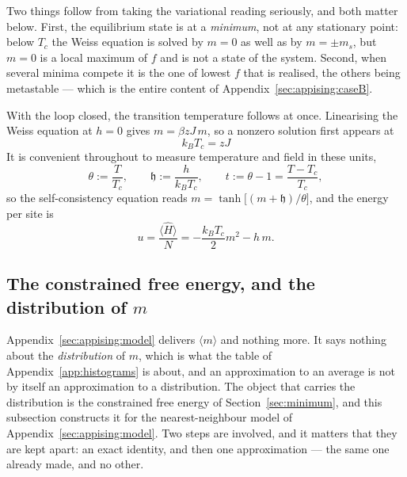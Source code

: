 \documentclass[10pt,a4paper]{article}
\theoremstyle{remark}
\begin{document}
Two things follow from taking the variational reading seriously, and both matter
below. First, the equilibrium state is at a \emph{minimum}, not at any stationary
point: below $T_c$ the Weiss equation is solved by $m=0$ as well as by
$m=\pm m_s$, but $m=0$ is a local maximum of $f$ and is not a state of the
system. Second, when several minima compete it is the one of lowest $f$ that is
realised, the others being metastable --- which is the entire content of
Appendix~\ref{sec:appising:caseB}.

With the loop closed, the transition temperature follows at once. Linearising the
Weiss equation at $h=0$ gives $m=\beta zJ\,m$, so a nonzero solution first
appears at
\[
\;k_BT_c=zJ\
\]
It is convenient throughout to measure temperature and field in these units,
\[
\theta:=\frac{T}{T_c},\qquad
\mathfrak{h}:=\frac{h}{k_BT_c},\qquad
t:=\theta-1=\frac{T-T_c}{T_c},
\]
so the self-consistency equation reads $m=\tanh\big[(m+\mathfrak{h})/\theta\big]$,
and the energy per site is
\[
u=\frac{\langle\hat H\rangle}{N}=-\frac{k_BT_c}{2}m^{2}-h\,m .
\]

\subsection{The constrained free energy, and the distribution of \texorpdfstring{$m$}{m}}
\label{sec:appising:exact}

Appendix~\ref{sec:appising:model} delivers $\langle m\rangle$ and nothing more. It
says nothing about the \emph{distribution} of $m$, which is what the table of
Appendix~\ref{app:histograms} is about, and an approximation to an average is not
by itself an approximation to a distribution. The object that carries the
distribution is the constrained free energy of Section~\ref{sec:minimum}, and
this subsection constructs it for the nearest-neighbour model of
Appendix~\ref{sec:appising:model}. Two steps are involved, and it matters that
they are kept apart: an exact identity, and then one approximation --- the same
one already made, and no other.
\end{document}
